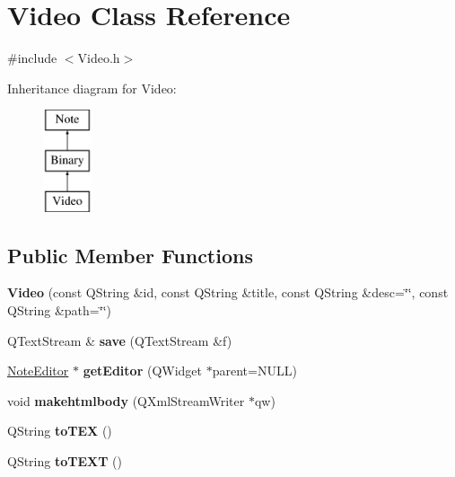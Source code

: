 \hypertarget{classVideo}{\section{\-Video \-Class \-Reference}
\label{classVideo}
}


{\ttfamily \#include $<$\-Video.\-h$>$}

\-Inheritance diagram for \-Video\-:\begin{figure}[H]
\begin{center}
\leavevmode
\includegraphics[height=3.000000cm]{classVideo}
\end{center}
\end{figure}
\subsection*{\-Public \-Member \-Functions}
\begin{DoxyCompactItemize}
\item 
\hypertarget{classVideo_a3168a14f309b49637eedc71e34977bae}{{\bfseries \-Video} (const \-Q\-String \&id, const \-Q\-String \&title, const \-Q\-String \&desc=\char`\"{}\char`\"{}, const \-Q\-String \&path=\char`\"{}\char`\"{})}\label{classVideo_a3168a14f309b49637eedc71e34977bae}

\item 
\hypertarget{classVideo_a15663427ca1d41338c05273757556b05}{\-Q\-Text\-Stream \& {\bfseries save} (\-Q\-Text\-Stream \&f)}\label{classVideo_a15663427ca1d41338c05273757556b05}

\item 
\hypertarget{classVideo_a04ebb4918373da74bc061823b26d1ef5}{\hyperlink{classNoteEditor}{\-Note\-Editor} $\ast$ {\bfseries get\-Editor} (\-Q\-Widget $\ast$parent=\-N\-U\-L\-L)}\label{classVideo_a04ebb4918373da74bc061823b26d1ef5}

\item 
\hypertarget{classVideo_a78404c789304e0049fc2f2748c521269}{void {\bfseries makehtmlbody} (\-Q\-Xml\-Stream\-Writer $\ast$qw)}\label{classVideo_a78404c789304e0049fc2f2748c521269}

\item 
\hypertarget{classVideo_a932c6b7632624a17ce95f8d537c6065e}{\-Q\-String {\bfseries to\-T\-E\-X} ()}\label{classVideo_a932c6b7632624a17ce95f8d537c6065e}

\item 
\hypertarget{classVideo_afb84bc4f21ccb46db6e539f5530009de}{\-Q\-String {\bfseries to\-T\-E\-X\-T} ()}\label{classVideo_afb84bc4f21ccb46db6e539f5530009de}

\end{DoxyCompactItemize}


